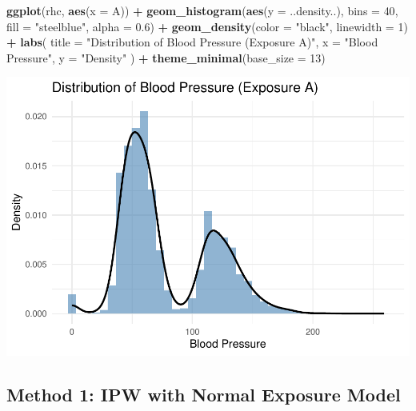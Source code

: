 \documentclass[
]{article}
\newenvironment{Shaded}{\begin{snugshade}}{\end{snugshade}}
\newcommand{\AttributeTok}[1]{\textcolor[rgb]{0.13,0.29,0.53}{#1}}
\newcommand{\DecValTok}[1]{\textcolor[rgb]{0.00,0.00,0.81}{#1}}
\newcommand{\FloatTok}[1]{\textcolor[rgb]{0.00,0.00,0.81}{#1}}
\newcommand{\FunctionTok}[1]{\textcolor[rgb]{0.13,0.29,0.53}{\textbf{#1}}}
\newcommand{\NormalTok}[1]{#1}
\newcommand{\SpecialCharTok}[1]{\textcolor[rgb]{0.81,0.36,0.00}{\textbf{#1}}}
\newcommand{\StringTok}[1]{\textcolor[rgb]{0.31,0.60,0.02}{#1}}
\begin{document}
\begin{Shaded}
\begin{Highlighting}[]
\FunctionTok{ggplot}\NormalTok{(rhc, }\FunctionTok{aes}\NormalTok{(}\AttributeTok{x =}\NormalTok{ A)) }\SpecialCharTok{+}
  \FunctionTok{geom\_histogram}\NormalTok{(}\FunctionTok{aes}\NormalTok{(}\AttributeTok{y =}\NormalTok{ ..density..), }\AttributeTok{bins =} \DecValTok{40}\NormalTok{, }\AttributeTok{fill =} \StringTok{"steelblue"}\NormalTok{, }\AttributeTok{alpha =} \FloatTok{0.6}\NormalTok{) }\SpecialCharTok{+}
  \FunctionTok{geom\_density}\NormalTok{(}\AttributeTok{color =} \StringTok{"black"}\NormalTok{, }\AttributeTok{linewidth =} \DecValTok{1}\NormalTok{) }\SpecialCharTok{+}
  \FunctionTok{labs}\NormalTok{(}
    \AttributeTok{title =} \StringTok{"Distribution of Blood Pressure (Exposure A)"}\NormalTok{,}
    \AttributeTok{x =} \StringTok{"Blood Pressure"}\NormalTok{,}
    \AttributeTok{y =} \StringTok{"Density"}
\NormalTok{  ) }\SpecialCharTok{+}
  \FunctionTok{theme\_minimal}\NormalTok{(}\AttributeTok{base\_size =} \DecValTok{13}\NormalTok{)}
\end{Highlighting}
\end{Shaded}

\includegraphics{rhc_analysis_files/figure-latex/plot-A-distribution-1.pdf}

\subsection{Method 1: IPW with Normal Exposure
Model}\label{method-1-ipw-with-normal-exposure-model}
\end{document}
